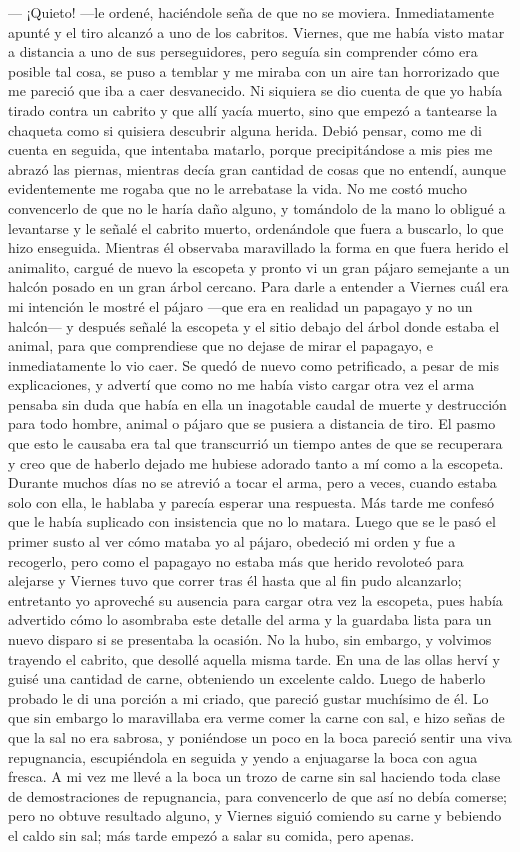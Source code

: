 \documentclass{novela}
\begin{document}
    — ¡Quieto! —le ordené, haciéndole seña de que no se moviera.
    Inmediatamente apunté y el tiro alcanzó a uno de los cabritos. Viernes, que me había visto matar a distancia a uno de sus perseguidores, pero seguía sin comprender cómo era posible tal cosa, se puso a temblar y me miraba con un aire tan horrorizado que me pareció que iba a caer desvanecido. Ni siquiera se dio cuenta de que yo había tirado contra un cabrito y que allí yacía muerto, sino que empezó a tantearse la chaqueta como si quisiera descubrir alguna herida. Debió pensar, como me di cuenta en seguida, que intentaba matarlo, porque precipitándose a mis pies me abrazó las piernas, mientras decía gran cantidad de cosas que no entendí, aunque evidentemente me rogaba que no le arrebatase la vida.
    No me costó mucho convencerlo de que no le haría daño alguno, y tomándolo de la mano lo obligué a levantarse y le señalé el cabrito muerto, ordenándole que fuera a buscarlo, lo que hizo enseguida. Mientras él observaba maravillado la forma en que fuera herido el animalito, cargué de nuevo la escopeta y pronto vi un gran pájaro semejante a un halcón posado en un gran árbol cercano. Para darle a entender a Viernes cuál era mi intención le mostré el pájaro —que era en realidad un papagayo y no un halcón— y después señalé la escopeta y el sitio debajo del árbol donde estaba el animal, para que comprendiese que no dejase de mirar el papagayo, e inmediatamente lo vio caer. Se quedó de nuevo como petrificado, a pesar de mis explicaciones, y advertí que como no me había visto cargar otra vez el arma pensaba sin duda que había en ella un inagotable caudal de muerte y destrucción para todo hombre, animal o pájaro que se pusiera a distancia de tiro.
    El pasmo que esto le causaba era tal que transcurrió un tiempo antes de que se recuperara y creo que de haberlo dejado me hubiese adorado tanto a mí como a la escopeta. Durante muchos días no se atrevió a tocar el arma, pero a veces, cuando estaba solo con ella, le hablaba y parecía esperar una respuesta. Más tarde me confesó que le había suplicado con insistencia que no lo matara.
    Luego que se le pasó el primer susto al ver cómo mataba yo al pájaro, obedeció mi orden y fue a recogerlo, pero como el papagayo no estaba más que herido revoloteó para alejarse y Viernes tuvo que correr tras él hasta que al fin pudo alcanzarlo; entretanto yo aproveché su ausencia para cargar otra vez la escopeta, pues había advertido cómo lo asombraba este detalle del arma y la guardaba lista para un nuevo disparo si se presentaba la ocasión. No la hubo, sin embargo, y volvimos trayendo el cabrito, que desollé aquella misma tarde. En una de las ollas herví y guisé una cantidad de carne, obteniendo un excelente caldo. Luego de haberlo probado le di una porción a mi criado, que pareció gustar muchísimo de él. Lo que sin embargo lo maravillaba era verme comer la carne con sal, e hizo señas de que la sal no era sabrosa, y poniéndose un poco en la boca pareció sentir una viva repugnancia, escupiéndola en seguida y yendo a enjuagarse la boca con agua fresca. A mi vez me llevé a la boca un trozo de carne sin sal haciendo toda clase de demostraciones de repugnancia, para convencerlo de que así no debía comerse; pero no obtuve resultado alguno, y Viernes siguió comiendo su carne y bebiendo el caldo sin sal; más tarde empezó a salar su comida, pero apenas.
\end{document}
